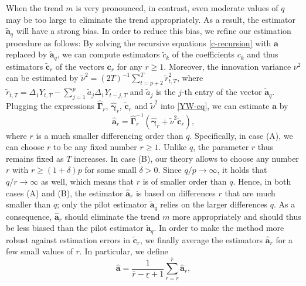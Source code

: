 When the trend $m$ is very pronounced, in contrast, even moderate values of $q$ may be too large to eliminate the trend appropriately. As a result, the estimator $\widetilde{\boldsymbol{a}}_q$ will have a strong bias. In order to reduce this bias, we refine our estimation procedure as follows: By solving the recursive equations \eqref{c-recursion} with $\boldsymbol{a}$ replaced by $\widetilde{\boldsymbol{a}}_q$, we can compute estimators $\widetilde{c}_k$ of the coefficients $c_k$ and thus estimators $\widetilde{\boldsymbol{c}}_r$ of the vectors $\boldsymbol{c}_r$ for any $r \ge 1$. Moreover, the innovation variance $\nu^2$ can be estimated by $\widetilde{\nu}^2 = (2T)^{-1} \sum_{t=p+2}^T \widetilde{r}_{t,T}^2$, where $\widetilde{r}_{t,T} = \Delta_1 Y_{t,T} - \sum_{j=1}^p \widetilde{a}_j \Delta_1 Y_{t-j,T}$ and $\widetilde{a}_j$ is the $j$-th entry of the vector $\widetilde{\boldsymbol{a}}_q$. Plugging the expressions $\widehat{\boldsymbol{\Gamma}}_r$, $\widehat{\boldsymbol{\gamma}}_r$, $\widetilde{\boldsymbol{c}}_r$ and $\widetilde{\nu}^2$ into \eqref{YW-eq}, we can estimate $\boldsymbol{a}$ by 
\begin{equation}\label{est-AR-SS} 
\widehat{\boldsymbol{a}}_r = \widehat{\boldsymbol{\Gamma}}_r^{-1} (\widehat{\boldsymbol{\gamma}}_r + \widetilde{\nu}^2 \widetilde{\boldsymbol{c}}_r),
\end{equation} 
where $r$ is a much smaller differencing order than $q$. Specifically, in case (A), we can choose $r$ to be any fixed number $r \ge 1$. Unlike $q$, the parameter $r$ thus remains fixed as $T$ increases. In case (B), our theory allows to choose any number $r$ with $r \ge (1+\delta) p$ for some small $\delta > 0$. Since $q/p \rightarrow \infty$, it holds that $q/r \rightarrow \infty$ as well, which means that $r$ is of smaller order than $q$. Hence, in both cases (A) and (B), the estimator $\widehat{\boldsymbol{a}}_r$ is based on differences $r$ that are much smaller than $q$; only the pilot estimator $\widetilde{\boldsymbol{a}}_q$ relies on the larger differences $q$. As a consequence, $\widehat{\boldsymbol{a}}_r$ should eliminate the trend $m$ more appropriately and should thus be less biased than the pilot estimator $\widetilde{\boldsymbol{a}}_q$. In order to make the method more robust against estimation errors in $\widetilde{\boldsymbol{c}}_r$, we finally average the estimators $\widehat{\boldsymbol{a}}_r$ for a few small values of $r$. In particular, we define  
\begin{equation}\label{est-AR}
\widehat{\boldsymbol{a}} = \frac{1}{\overline{r}-\underline{r}+1} \sum\limits_{r=\underline{r}}^{\overline{r}} \widehat{\boldsymbol{a}}_r, 
\end{equation}
